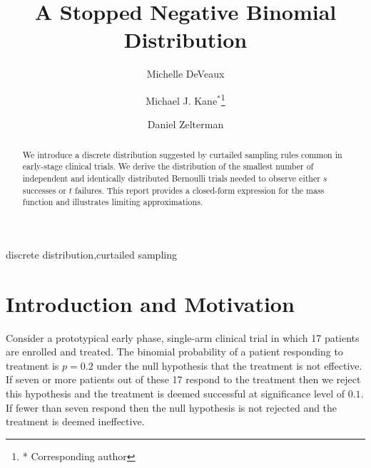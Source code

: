 \documentclass[review]{elsarticle}
\begin{document}
\begin{frontmatter}

\title{A Stopped Negative Binomial Distribution}


\author{Michelle DeVeaux}

\author{Michael J. Kane$^*$\footnote{* Corresponding author}}

\author{Daniel Zelterman}

\address{Department of Biostatistics\\ School of Epidemiology and Public Health\\ Yale University, New Haven, CT}

\begin{abstract}
We introduce a discrete distribution suggested by curtailed
sampling rules common in early-stage clinical trials. We derive the
distribution of the smallest number of independent and identically
distributed Bernoulli trials needed to observe either $s$ successes 
or $t$ failures. This report provides a closed-form expression for the 
mass function and illustrates limiting approximations.
\end{abstract}

\begin{keyword}
discrete distribution\sep curtailed sampling
\end{keyword}

\end{frontmatter}

\linenumbers

\section{Introduction and Motivation}

Consider a prototypical early phase, single-arm clinical trial in which 
17 patients
are enrolled and treated. The binomial probability of a patient 
responding to treatment is $p=0.2$ 
under the null hypothesis that the treatment is not effective.
If seven or more patients out of these 17 respond to the treatment then we 
reject this hypothesis and the treatment is deemed successful at 
significance level of $0.1$.  If fewer than seven respond then the null 
hypothesis is not 
rejected and the treatment is deemed ineffective.
\end{document}
